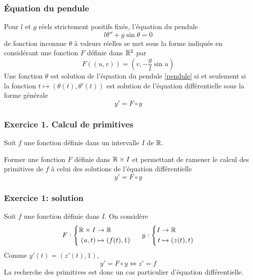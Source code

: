 \begin{frame}
  \frametitle{\'Equation du pendule}
Pour $l$ et $g$ réels strictement positifs fixés, l'équation du pendule
\begin{equation}
  l\theta'' + g \sin \theta = 0
  \label{pendule}
\end{equation}
de fonction inconnue $\theta$ à valeurs réelles se met sous la forme indiquée en considérant une fonction $F$ définie dans $\mathbb{R}^2$ par 
\begin{displaymath}
  F((u,v)) = (v,-\frac{g}{l}\sin u)
\end{displaymath}
Une fonction $\theta$ est solution de l'équation du pendule \eqref{pendule} si et seulement si la fonction $t\mapsto (\theta(t),\theta'(t))$ est solution de l'équation différentielle sous la forme générale
\begin{equation*}
  y' = F\circ y
\end{equation*}  
\end{frame}

\begin{frame}
\frametitle{Exercice 1. Calcul de primitives}
Soit $f$ une fonction définie dans un intervalle $I$ de $\mathbb{R}$.

Former une fonction $F$ définie dans $\mathbb{R}\times I$ et permettant de ramener le calcul des primitives de $f$ à celui des solutions de l'équation différentielle
\begin{equation*}
  y' = F\circ y
\end{equation*}  
\end{frame}

\begin{frame}
\frametitle{Exercice 1: solution}
Soit $f$ une fonction définie dans $I$. On considère
\begin{displaymath}
  F :
\left\lbrace 
\begin{aligned}
  \mathbb{R} \times I &\rightarrow \mathbb{R} \\
  (u,t) &\mapsto (f(t),1) 
\end{aligned}
\right. 
\hspace{0.5cm} y:
\left\lbrace 
\begin{aligned}
  I &\rightarrow \mathbb{R} \\
  t &\mapsto (z(t),t) 
\end{aligned}
\right. 
\end{displaymath}
Comme $y'(t)=(z'(t),1)$,
\begin{displaymath}
  y' = F\circ y \Leftrightarrow z' = f
\end{displaymath}
La recherche des primitives est donc un cas particulier d'équation différentielle.
\end{frame}

